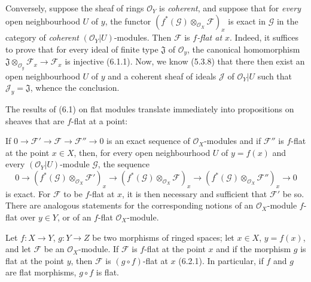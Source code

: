 \begin{env}[6.7.3]
\label{0.6.7.3}
Conversely, suppose the sheaf of rings $\mathcal O_Y$ is \emph{coherent}, and
suppose that for \emph{every} open neighbourhood $U$ of $y$, the functor
$(f^*(\mathcal G)\otimes_{\mathcal O_X}\mathcal F)_x$ is exact in
$\mathcal G$ in the category of \emph{coherent} $(\mathcal O_Y|U)$-modules.
Then $\mathcal F$ is \emph{$f$-flat at $x$}. Indeed, it suffices to prove that
for every ideal of finite type $\mathfrak J$ of $\mathcal O_y$,
the canonical homomorphism
$\mathfrak J\otimes_{\mathcal O_y}\mathcal F_x\to\mathcal F_x$ is injective
(6.1.1). Now, we know (5.3.8) that there then exist an open
neighbourhood $U$ of $y$ and a coherent sheaf of ideals $\mathcal J$ of
$\mathcal O_Y|U$ such that $\mathcal J_y=\mathfrak J$, whence the conclusion.
\end{env}

\begin{env}[6.7.4]
\label{0.6.7.4}
The results of (6.1) on flat modules translate immediately into
propositions on sheaves that are $f$-flat at a point:

If $0\to\mathcal F'\to\mathcal F\to\mathcal F''\to0$ is an exact sequence
of $\mathcal O_X$-modules and if $\mathcal F''$ is $f$-flat at the point
$x\in X$, then, for every open neighbourhood $U$ of $y=f(x)$ and every
$(\mathcal O_Y|U)$-module $\mathcal G$, the sequence
\[
  0\longrightarrow
  (f^*(\mathcal G)\otimes_{\mathcal O_X}\mathcal F')_x
  \longrightarrow
  (f^*(\mathcal G)\otimes_{\mathcal O_X}\mathcal F)_x
  \longrightarrow
  (f^*(\mathcal G)\otimes_{\mathcal O_X}\mathcal F'')_x
  \longrightarrow0
\]
is exact. For $\mathcal F$ to be $f$-flat at $x$, it is then necessary and sufficient
that $\mathcal F'$ be so. There are analogous statements for the
corresponding notions of an $\mathcal O_X$-module $f$-flat over $y\in Y$, or
of an $f$-flat $\mathcal O_X$-module.
\end{env}

\begin{env}[6.7.5]
\label{0.6.7.5}
Let $f:X\to Y$, $g:Y\to Z$ be two morphisms of ringed spaces; let
$x\in X$, $y=f(x)$, and let $\mathcal F$ be an $\mathcal O_X$-module. If $\mathcal F$
is $f$-flat at the point $x$ and if the morphism $g$ is flat at the point $y$, then
$\mathcal F$ is $(g\circ f)$-flat at $x$ (6.2.1). In particular, if $f$ and
$g$ are flat morphisms, $g\circ f$ is flat.
\end{env}

